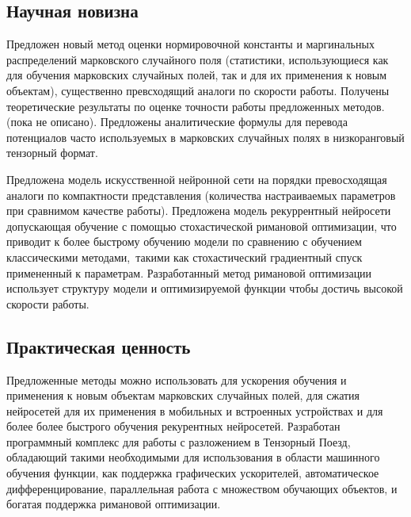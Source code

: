 \subsection{Научная новизна} \label{sec:intro-novelity}
Предложен новый метод оценки нормировочной константы и маргинальных распределений марковского случайного поля (статистики, использующиеся как для обучения марковских случайных полей, так и для их применения к новым объектам), существенно превсходящий аналоги по скорости работы. Получены теоретические результаты по оценке точности работы предложенных методов. \alert{(пока не описано). Предложены аналитические формулы для перевода потенциалов часто используемых в марковских случайных полях в низкоранговый тензорный формат.}

Предложена модель искусственной нейронной сети на порядки превосходящая аналоги по компактности представления (количества настраиваемых параметров при сравнимом качестве работы). Предложена модель рекуррентный нейросети допускающая обучение с помощью стохастической римановой оптимизации, что приводит к более быстрому обучению модели по сравнению с обучением классическими методами, такими как стохастический градиентный спуск примененный к параметрам. Разработанный метод римановой оптимизации использует структуру модели и оптимизируемой функции чтобы достичь высокой скорости работы.

\subsection{Практическая ценность} \label{sec:intro-appliability}
Предложенные методы можно использовать для ускорения обучения и применения к новым объектам марковских случайных полей, для сжатия нейросетей для их применения в мобильных и встроенных устройствах и для более более быстрого обучения рекурентных нейросетей. Разработан программный комплекс для работы с разложением в Тензорный Поезд, обладающий такими необходимыми для использования в области машинного обучения функции, как поддержка графических ускорителей, автоматическое дифференцирование, параллельная работа с множеством обучающих объектов, и богатая поддержка римановой оптимизации.

